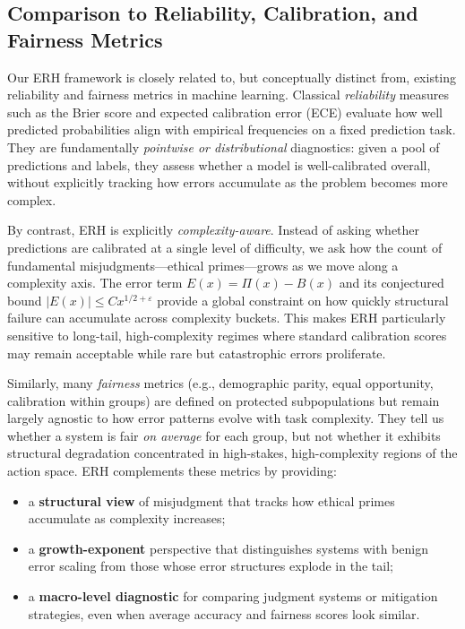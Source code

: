 \documentclass[12pt,a4paper]{article}
\theoremstyle{definition}
\theoremstyle{remark}
\begin{document}
\subsection{Comparison to Reliability, Calibration, and Fairness Metrics}
\label{subsec:comparison_calibration}

Our ERH framework is closely related to, but conceptually distinct from, existing reliability and fairness metrics in machine learning.
Classical \emph{reliability} measures such as the Brier score and expected calibration error (ECE) evaluate how well predicted probabilities align with empirical frequencies on a fixed prediction task.
They are fundamentally \emph{pointwise or distributional} diagnostics: given a pool of predictions and labels, they assess whether a model is well-calibrated overall, without explicitly tracking how errors accumulate as the problem becomes more complex.

By contrast, ERH is explicitly \emph{complexity-aware}.
Instead of asking whether predictions are calibrated at a single level of difficulty, we ask how the count of fundamental misjudgments---ethical primes---grows as we move along a complexity axis.
The error term $E(x) = \Pi(x) - B(x)$ and its conjectured bound $|E(x)| \leq C x^{1/2+\varepsilon}$ provide a global constraint on how quickly structural failure can accumulate across complexity buckets.
This makes ERH particularly sensitive to long-tail, high-complexity regimes where standard calibration scores may remain acceptable while rare but catastrophic errors proliferate.

Similarly, many \emph{fairness} metrics (e.g., demographic parity, equal opportunity, calibration within groups) are defined on protected subpopulations but remain largely agnostic to how error patterns evolve with task complexity.
They tell us whether a system is fair \emph{on average} for each group, but not whether it exhibits structural degradation concentrated in high-stakes, high-complexity regions of the action space.
ERH complements these metrics by providing:
\begin{itemize}
    \item a \textbf{structural view} of misjudgment that tracks how ethical primes accumulate as complexity increases;
    \item a \textbf{growth-exponent} perspective that distinguishes systems with benign error scaling from those whose error structures explode in the tail;
    \item a \textbf{macro-level diagnostic} for comparing judgment systems or mitigation strategies, even when average accuracy and fairness scores look similar.
\end{itemize}
\end{document}
